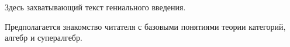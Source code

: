 Здесь захватывающий текст гениального введения.

Предполагается знакомство читателя с базовыми понятиями теории категорий,
алгебр и супералгебр.